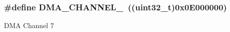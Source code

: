 \subsubsection[{\texorpdfstring{D\+M\+A\+\_\+\+C\+H\+A\+N\+N\+E\+L\+\_\+7}{DMA_CHANNEL_7}}]{\setlength{\rightskip}{0pt plus 5cm}\#define D\+M\+A\+\_\+\+C\+H\+A\+N\+N\+E\+L\+\_~((uint32\+\_\+t)0x0\+E000000)}\hypertarget{group___d_m_a___channel__selection_ga77ff4e8675a3991feb20e385242f34ab}{}\label{group___d_m_a___channel__selection_ga77ff4e8675a3991feb20e385242f34ab}
D\+MA Channel 7 